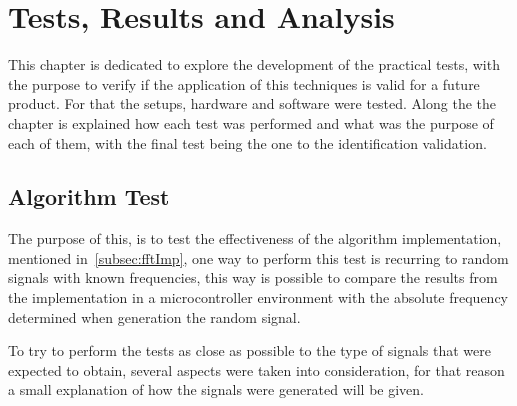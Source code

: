 \cleardoublepage
\chapter{Tests, Results and Analysis}\label{chap:Tests}
This chapter is dedicated to explore the development of the practical tests, with the purpose to verify if the application of this techniques is valid for a future product. For that the setups, hardware and software were tested. Along the the chapter is explained how each test was performed and what was the purpose of each of them, with the final test being the one to the identification validation. 
\section{Algorithm Test}
The purpose of this, is to test the effectiveness of the algorithm implementation, mentioned in~\ref{subsec:fftImp}, one way to perform this test is recurring to random signals with known frequencies, this way is possible to compare the results from the implementation in a microcontroller environment with the absolute frequency determined when generation the random signal.

To try to perform the tests as close as possible to the type of signals that were expected to obtain, several aspects were taken into consideration, for that reason a small explanation of how the signals were generated will be given. 

